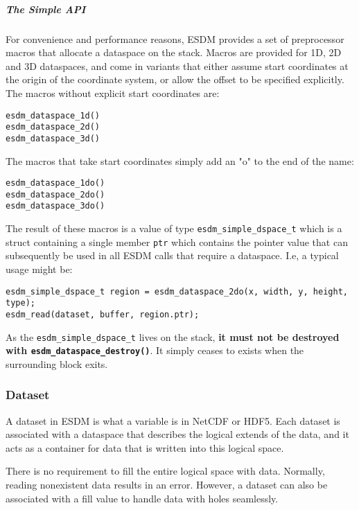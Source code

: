 \subparagraph{The Simple API}

For convenience and performance reasons, ESDM provides a set of
preprocessor macros that allocate a dataspace on the stack. Macros are
provided for 1D, 2D and 3D dataspaces, and come in variants that either
assume start coordinates at the origin of the coordinate system, or
allow the offset to be specified explicitly. The macros without explicit
start coordinates are:

\begin{lstlisting}
esdm_dataspace_1d()
esdm_dataspace_2d()
esdm_dataspace_3d()
\end{lstlisting}

The macros that take start coordinates simply add an "o" to the end of
the name:

\begin{lstlisting}
esdm_dataspace_1do()
esdm_dataspace_2do()
esdm_dataspace_3do()
\end{lstlisting}

The result of these macros is a value of type \lstinline|esdm_simple_dspace_t| which is a struct containing a single member \lstinline|ptr| which contains the pointer value that can subsequently be used in all ESDM calls that require a dataspace. I.e, a typical usage might be:

\begin{lstlisting}
esdm_simple_dspace_t region = esdm_dataspace_2do(x, width, y, height, type);
esdm_read(dataset, buffer, region.ptr);
\end{lstlisting}

As the \lstinline|esdm_simple_dspace_t| lives on the stack, \textbf{it must not be destroyed with \lstinline|esdm_dataspace_destroy()|}. 
It simply ceases to exists when the surrounding block exits.

\subsubsection{Dataset}
\label{sec:user-guides:dataset}

A dataset in ESDM is what a variable is in NetCDF or HDF5. 
Each dataset is associated with a dataspace that describes the logical extends of the data, and it acts as a container for data that is written into this logical space.

There is no requirement to fill the entire logical space with data. 
Normally, reading nonexistent data results in an error. 
However, a dataset can also be associated with a fill value to handle data with holes seamlessly.

